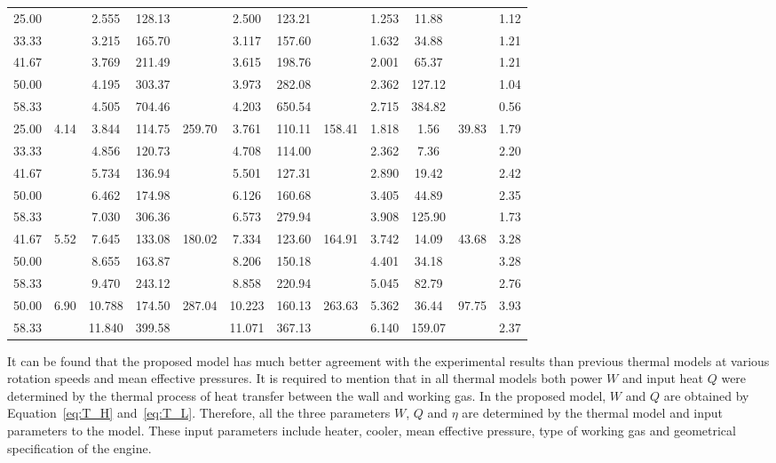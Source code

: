 \documentclass[review,3p,10t]{elsarticle}
\begin{document}
\begin{table}[htbp]
\begin{center}
\begin{tabular}{cccccccccccc}
		25.00	&&2.555	&128.13	&&2.500	&123.21	&&1.253	&11.88	&&1.12\\
		33.33	&&3.215	&165.70	&&3.117	&157.60	&&1.632	&34.88	&&1.21\\
		41.67	&&3.769	&211.49	&&3.615	&198.76	&&2.001	&65.37	&&1.21\\
		50.00	&&4.195	&303.37	&&3.973	&282.08	&&2.362	&127.12	&&1.04\\
		58.33	&&4.505	&704.46	&&4.203	&650.54	&&2.715	&384.82	&&0.56\\
		\midrule
		25.00	&\multirow{5}{*}{4.14}	&3.844	&114.75	&\multirow{5}{*}{259.70}	&3.761	&110.11	&\multirow{5}{*}{158.41}	&1.818	&1.56	&\multirow{5}{*}{39.83}	&1.79\\
		33.33	&&4.856	&120.73	&&4.708	&114.00	&&2.362	&7.36	&&2.20\\
		41.67	&&5.734	&136.94	&&5.501	&127.31	&&2.890	&19.42	&&2.42\\
		50.00	&&6.462	&174.98	&&6.126	&160.68	&&3.405	&44.89	&&2.35\\
		58.33	&&7.030	&306.36	&&6.573	&279.94	&&3.908	&125.90	&&1.73\\
		\midrule
		41.67	&\multirow{3}{*}{5.52}	&7.645	&133.08	&\multirow{3}{*}{180.02}	&7.334	&123.60	&\multirow{3}{*}{164.91}	&3.742	&14.09	&\multirow{3}{*}{43.68}	&3.28\\
		50.00	&&8.655	&163.87	&&8.206	&150.18	&&4.401	&34.18	&&3.28\\
		58.33	&&9.470	&243.12	&&8.858	&220.94	&&5.045	&82.79	&&2.76\\
		\midrule
		50.00	&\multirow{2}{*}{6.90}	&10.788	&174.50	&\multirow{2}{*}{287.04}	&10.223	&160.13	&\multirow{2}{*}{263.63}	&5.362	&36.44	&\multirow{2}{*}{97.75}		&3.93\\
		58.33	&&11.840	&399.58	&&11.071	&367.13	&&6.140	&159.07	&&2.37\\
		\bottomrule
	\end{tabular}
	\end{center}
	\label{tab:PowerComparison}
\end{table}

It can be found that the proposed model has much better agreement with the experimental results than previous thermal models at various rotation speeds and mean effective pressures. It is required to mention that in all thermal models both power $W$ and input heat $Q$ were determined by the thermal process of heat transfer between the wall and working gas. In the proposed model, $W$ and $Q$ are obtained by Equation~\ref{eq:T_H} and~\ref{eq:T_L}. Therefore, all the three parameters $W$, $Q$ and $\eta$ are determined by the thermal model and input parameters to the model. These input parameters include heater, cooler, mean effective pressure, type of working gas and geometrical specification of the engine.
\end{document}
